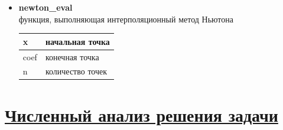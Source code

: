 \documentclass[14pt]{extarticle}
\begin{document}
\begin{itemize}
		\item \textbf{newton\_eval}\\
		функция, выполняющая интерполяционный метод Ньютона
		\begin{table}[H]
			\begin{tabular}{|p{4cm}|p{10cm}|}
				\hline
				x & начальная точка \\
				\hline
				coef & конечная точка \\
				\hline
				n & количество точек \\
				\hline
			\end{tabular}
		\end{table}
	\end{itemize}
	
	
	\newpage
	\section{\Large \underline{Численный анализ решения задачи}}
	
\end{document}
